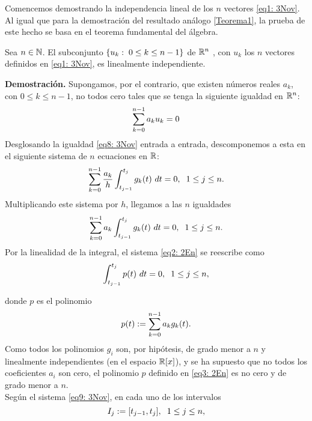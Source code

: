 Comencemos demostrando la independencia lineal
de los $n$ vectores \eqref{eq1: 3Nov}. Al igual que para
la demostración del resultado análogo 
\ref{Teorema1},
la prueba de este hecho se basa en el teorema
fundamental del álgebra.

\begin{prop}
\label{prop: los uk forman una base de Rn}
Sea $n \in \mathbb{N}$. El 
subconjunto $\{u_{k} : \hspace{0.1cm} 0 \leq k \leq n-1 \}$
de $\mathbb{R}^{n}$ , con
$u_{k}$ los $n$ vectores definidos en 
\eqref{eq1: 3Nov},
es linealmente independiente.
\end{prop}
\noindent
\textbf{Demostración.}
Supongamos, por el contrario, 
que existen números reales $a_{k}$, con $0 \leq k \leq n-1$,
no todos cero tales que se tenga la siguiente igualdad en $\mathbb{R}^{n}$:
\begin{equation}
\label{eq8: 3Nov}
\sum\limits_{k=0}^{n-1}a_{k}u_{k}=0
\end{equation}
Desglosando
la igualdad \eqref{eq8: 3Nov} 
entrada a entrada, descomponemos
a esta en el siguiente sistema de $n$ ecuaciones en $\mathbb{R}$:
\[
\sum\limits_{k=0}^{n-1} \frac{a_{k}}{h} \int_{t_{j-1}}^{t_{j}}g_{k}(t)\ dt = 0,
\hspace{0.2cm} 1 \leq j \leq n.
\]
Multiplicando este sistema por $h$, llegamos a las
$n$ igualdades
\begin{equation}
\label{eq2: 2En}
\sum\limits_{k=0}^{n-1}a_{k} \int_{t_{j-1}}^{t_{j}}g_{k}(t)\ dt = 0,
\hspace{0.2cm} 1 \leq j \leq n.
\end{equation}
Por la linealidad de la integral, el sistema \eqref{eq2: 2En}
se reescribe como
\begin{equation}
\label{eq9: 3Nov}
\int_{t_{j-1}}^{t_{j}}p(t)\ dt =0,
\hspace{0.2cm} 1 \leq j \leq n,
\end{equation}


\noindent donde $p$ es el polinomio 
\begin{equation}
\label{eq3: 2En}
p(t):=\sum\limits_{k=0}^{n-1}a_{k}g_{k}(t). 
\end{equation}
Como todos los polinomios $g_{i}$ son,
por hipótesis, de 
grado menor a $n$ y linealmente independientes
(en el espacio $\mathbb{R}[x]$),
y se ha supuesto que no
todos los
coeficientes $a_{i}$ son cero, el polinomio
$p$ definido en \eqref{eq3: 2En} es no cero y de grado
menor a $n$. \\

Según el sistema \eqref{eq9: 3Nov}, en cada uno
de los intervalos
\[
I_{j}:=[t_{j-1}, t_{j}], \hspace{0.2cm} 1 \leq j \leq n,
\]

